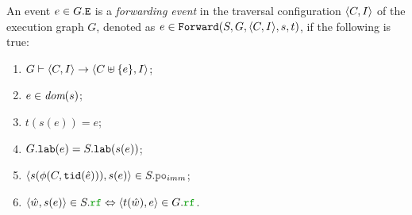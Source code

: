\documentclass[12pt]{article}
\begin{document}
\begin{definition}
  An event $e \in G.{\mathtt{E}}$ is a \emph{forwarding event} in
  the traversal configuration $\langle C, I \rangle$ of the execution graph $G$,
  denoted as $e \in {\mathtt{Forward}}(S, G, \langle C, I \rangle, s, t)$, if the following is true:
  \begin{enumerate}[label=\textbf{F.\arabic*}]

    \item \label{item:frwd-coverable}
      $G \vdash \langle C, I \rangle \rightarrow \langle C \uplus \{e\}, I \rangle$;

    \item \label{item:frwd-dom-s}
      $e \in \textit{dom}{({s})}$;
      
    \item \label{item:frwd-ts-id}
      $t(s(e)) = e$;

    \item \label{item:frwd-descr}
      $G.{\mathtt{lab}}(e) = S.{\mathtt{lab}}(s(e))$;

    \item \label{item:frwd-front}
      $\tup{s(\front(C, \lTID(\hat{e}))), s(e)} \in S.\lPO_{imm}$;

    \item \label{item:frwd-rf}
      $\tup{\hat{w}, s(e)} \in S.\lRF \Leftrightarrow \tup{t(\hat{w}), e} \in G.\lRF$.

  \end{enumerate}
\end{definition}
\end{document}
